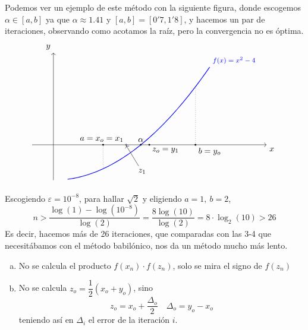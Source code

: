 \begin{intgraf} Podemos ver un ejemplo de este método con la siguiente figura, donde escogemos $\alpha \in [a,b]$ ya que $\alpha\approx 1.41$ y $[a,b]=[0'7,1'8]$, y hacemos un par de iteraciones, observando como acotamos la raíz, pero la convergencia no es óptima.
$$\begin{tikzpicture}[scale=3, domain=-1:2, samples=70,  trig format=rad]
    
	\draw[->] (-0.3,0) -- (3,0) node[below right] {$x$};
	\draw[->] (0,-0.5) -- (0,1.3) node[above left] {$y$};
	
	\draw[blue, thick] plot[domain=0.2:2.2] (\x,0.33*\x*\x-0.5) node[above right] {\footnotesize $f(x)=x^2-4$};

    \draw[fill=black] (1.23,0) circle [radius=0.01] node[above] {$\alpha$};
     \draw[fill=black] (0.7,0) circle [radius=0.01] node[above] {$a=x_o=x_1$ \hspace{15mm}};
     \draw[fill=black] (2,0) circle [radius=0.01] node[below right] {$b=y_o$ \; \; };
     \draw[dotted] (2,0) -- (2,0.82);
     \draw[dotted] (0.7,0) -- (0.7,-0.34);
     \draw[fill=black] (1.35,0) circle [radius=0.01] node[below right] {$z_o=y_1\; \; \; \;$};
     \draw[<-] (1.025,-0.01) -- (1.2,-0.3)  node[below] {$\; \; \; z_1$};
     \draw[->] (1.025,0) circle [radius=0.01];
     
\end{tikzpicture}$$    
\end{intgraf}
\begin{ejem}
    Escogiendo $\varepsilon=10^{-8}$, para hallar $\sqrt{2}$ y eligiendo $a=1, \: b=2$, $$n>\dfrac{\log(1)-\log(10^{-8})}{\log(2)}=\dfrac{8\log(10)}{\log(2)} = 8 \cdot \log_2(10) > 26$$
    Es decir, hacemos más de 26 iteraciones, que comparadas con las 3-4 que necesitábamos con el método babilónico, nos da un método mucho más lento.
\end{ejem}
\begin{obs}\:\vspace{-5mm}
    \begin{enumerate}[a)]
        \item No se calcula el producto $f(x_n)\cdot f(z_n)$, solo se mira el signo de $f(z_n)$
        \item No se calcula $z_o=\dfrac{1}{2}(x_o+y_o)$, sino 
        $$z_o=x_o+\dfrac{\Delta_o}{2} \quad \Delta_o=y_o-x_o$$
        teniendo así en $\Delta_i$ el error de la iteración $i$.
    \end{enumerate}
\end{obs}
